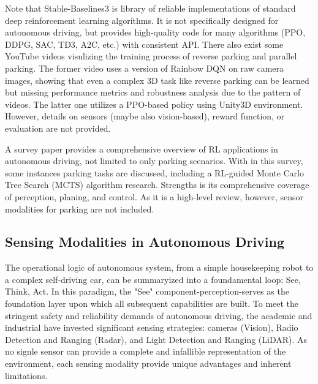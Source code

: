 \documentclass{article}
\begin{document}
Note that Stable-Baselines3 \cite{stable-baselines3} is library of reliable implementations of standard deep reinforcement learning algorithms. It is not specifically designed for autonomous driving, but provides high-quality code for many algorithms (PPO, DDPG, SAC, TD3, A2C, etc.) with consistent API. There also exist some YouTube videos \citep{youtube2019,youtube2022} visulizing the training process of reverse parking and parallel parking. The former video uses a version of Rainbow DQN on raw camera images, showing that even a complex 3D task like reverse parking can be learned but missing performance metrics and robustness analysis due to the pattern of videos. The latter one utilizes a PPO-based policy using Unity3D environment. However, details on sensors (maybe also vision-based), reward function, or evaluation are not provided.

A survey paper \cite{elallid2022comprehensive} provides a comprehensive overview of RL applications in autonomous driving, not limited to only parking scenarios. With in this survey, some instances parking tasks are discussed, including a RL-guided Monte Carlo Tree Search (MCTS) algorithm research. Strengths is its comprehensive coverage of perception, planing, and control. As it is a high-level review, however, sensor modalities for parking are not included.

\subsection{Sensing Modalities in Autonomous Driving}

The operational logic of autonomous system, from a simple housekeeping robot to a complex self-driving car, can be summaryized into a foundamental loop: See, Think, Act. In this paradigm, the "See" component-perception-serves as the foundation layer upon which all subsequent capabilities are built. To meet the stringent safety and reliability demands of autonomous driving, the academic and industrial have invested significant sensing strategies: cameras (Vision), Radio Detection and Ranging (Radar), and Light Detection and Ranging (LiDAR). As no signle sensor can provide a complete and infallible representation of the environment, each sensing modality provide unique advantages and inherent limitations.
\end{document}
